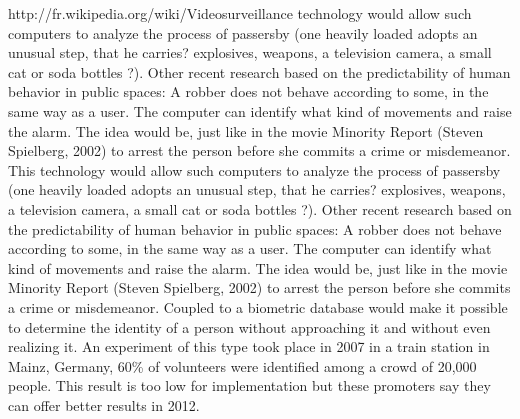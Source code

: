 http://fr.wikipedia.org/wiki/Videosurveillance
 technology would allow such computers to analyze the process of passersby (one heavily loaded adopts an unusual step, that he carries? explosives, weapons, a television camera, a small cat or soda bottles ?). Other recent research based on the predictability of human behavior in public spaces: A robber does not behave according to some, in the same way as a user. The computer can identify what kind of movements and raise the alarm. The idea would be, just like in the movie Minority Report (Steven Spielberg, 2002) to arrest the person before she commits a crime or misdemeanor.
This technology would allow such computers to analyze the process of passersby (one heavily loaded adopts an unusual step, that he carries? explosives, weapons, a television camera, a small cat or soda bottles ?). Other recent research based on the predictability of human behavior in public spaces: A robber does not behave according to some, in the same way as a user. The computer can identify what kind of movements and raise the alarm. The idea would be, just like in the movie Minority Report (Steven Spielberg, 2002) to arrest the person before she commits a crime or misdemeanor.
Coupled to a biometric database would make it possible to determine the identity of a person without approaching it and without even realizing it. An experiment of this type took place in 2007 in a train station in Mainz, Germany, 60\% of volunteers were identified among a crowd of 20,000 people. This result is too low for implementation but these promoters say they can offer better results in 2012.


